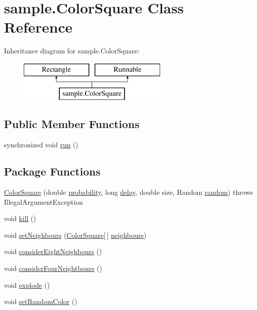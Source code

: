 \hypertarget{classsample_1_1_color_square}{}\section{sample.\+Color\+Square Class Reference}
\label{classsample_1_1_color_square}
Inheritance diagram for sample.\+Color\+Square\+:\begin{figure}[H]
\begin{center}
\leavevmode
\includegraphics[height=2.000000cm]{classsample_1_1_color_square}
\end{center}
\end{figure}
\subsection*{Public Member Functions}
\begin{DoxyCompactItemize}
\item 
synchronized void \mbox{\hyperlink{classsample_1_1_color_square_a01bfc80ce93985adcaf9f26226a5166c}{run}} ()
\end{DoxyCompactItemize}
\subsection*{Package Functions}
\begin{DoxyCompactItemize}
\item 
\mbox{\hyperlink{classsample_1_1_color_square_a2273dc7c774e92a81ce858facc815ec7}{Color\+Square}} (double \mbox{\hyperlink{classsample_1_1_color_square_af4e8f71262ff634ecd5d6261853b023d}{probability}}, long \mbox{\hyperlink{classsample_1_1_color_square_ac96754f907bed6644d7a18e5992af853}{delay}}, double size, Random \mbox{\hyperlink{classsample_1_1_color_square_a398146a0cc15168fc6fbe5aac3e9f50b}{random}})  throws Illegal\+Argument\+Exception 
\item 
void \mbox{\hyperlink{classsample_1_1_color_square_a3089d9adec502bdcbec959c142872397}{kill}} ()
\item 
void \mbox{\hyperlink{classsample_1_1_color_square_a8bc5e469f5dc2dd0a9a1963112b77fee}{set\+Neighbours}} (\mbox{\hyperlink{classsample_1_1_color_square}{Color\+Square}}\mbox{[}$\,$\mbox{]} \mbox{\hyperlink{classsample_1_1_color_square_a262acfde2a2981d945f37c9600904ff1}{neighbours}})
\item 
void \mbox{\hyperlink{classsample_1_1_color_square_ac913da0d2207fc676be2892fd9a9f5be}{consider\+Eight\+Neighbours}} ()
\item 
void \mbox{\hyperlink{classsample_1_1_color_square_ac487f0d013c9da85fbfbb5c5221eb1e5}{consider\+Four\+Neightbours}} ()
\item 
void \mbox{\hyperlink{classsample_1_1_color_square_a7a9627028e034d129f9d408c89226aab}{explode}} ()
\item 
void \mbox{\hyperlink{classsample_1_1_color_square_a268fbcc6abfcd0a2f74d94f067a9c2c7}{set\+Random\+Color}} ()
\end{DoxyCompactItemize}
